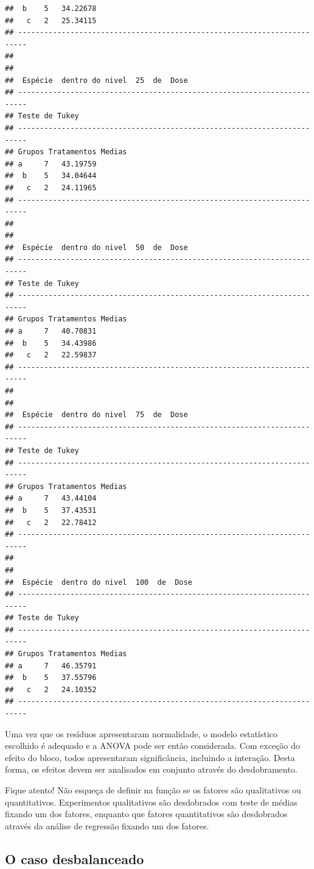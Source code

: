 \documentclass[
]{article}
\begin{document}
\begin{verbatim}
##  b    5   34.22678 
##   c   2   25.34115 
## ------------------------------------------------------------------------
## 
## 
##  Espécie  dentro do nivel  25  de  Dose 
## ------------------------------------------------------------------------
## Teste de Tukey
## ------------------------------------------------------------------------
## Grupos Tratamentos Medias
## a     7   43.19759 
##  b    5   34.04644 
##   c   2   24.11965 
## ------------------------------------------------------------------------
## 
## 
##  Espécie  dentro do nivel  50  de  Dose 
## ------------------------------------------------------------------------
## Teste de Tukey
## ------------------------------------------------------------------------
## Grupos Tratamentos Medias
## a     7   40.70831 
##  b    5   34.43986 
##   c   2   22.59837 
## ------------------------------------------------------------------------
## 
## 
##  Espécie  dentro do nivel  75  de  Dose 
## ------------------------------------------------------------------------
## Teste de Tukey
## ------------------------------------------------------------------------
## Grupos Tratamentos Medias
## a     7   43.44104 
##  b    5   37.43531 
##   c   2   22.78412 
## ------------------------------------------------------------------------
## 
## 
##  Espécie  dentro do nivel  100  de  Dose 
## ------------------------------------------------------------------------
## Teste de Tukey
## ------------------------------------------------------------------------
## Grupos Tratamentos Medias
## a     7   46.35791 
##  b    5   37.55796 
##   c   2   24.10352 
## ------------------------------------------------------------------------
\end{verbatim}

Uma vez que os resíduos apresentaram normalidade, o modelo estatístico escolhido é adequado e a ANOVA pode ser então considerada. Com exceção do efeito do bloco, todos apresentaram significância, incluindo a interação. Desta forma, os efeitos devem ser analisados em conjunto através do desdobramento.

Fique atento! Não esqueça de definir na função se os fatores são qualitativos ou quantitativos. Experimentos qualitativos são desdobrados com teste de médias fixando um dos fatores, enquanto que fatores quantitativos são desdobrados através da análise de regressão fixando um dos fatores.

\hypertarget{o-caso-desbalanceado-3}{%
\subsection{O caso desbalanceado}\label{o-caso-desbalanceado-3}}
\end{document}
